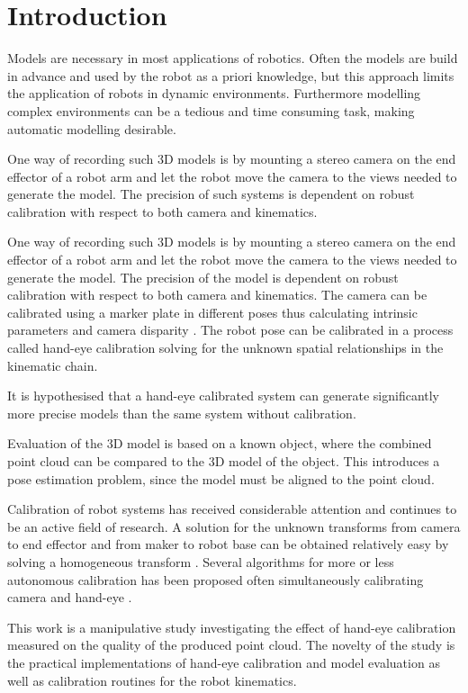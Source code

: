 \chapter{Introduction}

Models are necessary in most applications of robotics. Often the models are build in advance and used by the robot as a priori knowledge, but this approach limits the application of robots in dynamic environments. Furthermore modelling complex environments can be a tedious and time consuming task, making automatic modelling desirable. 

One way of recording such 3D models is by mounting a stereo camera on the end effector of a robot arm and let the robot move the camera to the views needed to generate the model. The precision of such systems is dependent on robust calibration with respect to both camera and kinematics.

One way of recording such 3D models is by mounting a stereo camera on the end effector of a robot arm and let the robot move the camera to the views needed to generate the model. The precision of the model is dependent on robust calibration with respect to both camera and kinematics. The camera can be calibrated using a marker plate in different poses thus calculating intrinsic parameters and camera disparity \cite{Zhang2000}. The robot pose can be calibrated in a process called hand-eye calibration solving for the unknown spatial relationships in the kinematic chain. 

It is hypothesised that a hand-eye calibrated system can generate significantly more precise models than the same system without calibration.

Evaluation of the 3D model is based on a known object, where the combined point cloud can be compared to the 3D model of the object. This introduces a pose estimation problem, since the model must be aligned to the point cloud. 

Calibration of robot systems has received considerable attention and continues to be an active field of research. A solution for the unknown transforms from camera to end effector and from maker to robot base can be obtained relatively easy by solving a homogeneous transform \cite{Shiu1989}. Several algorithms for more or less autonomous calibration has been proposed \cite{Tsai1988, Tsai1989} often simultaneously calibrating camera and hand-eye \cite{Malm2003, Zhao2008, Jordt2009}.

This work is a manipulative study investigating the effect of hand-eye calibration measured on the quality of the produced point cloud. The novelty of the study is the practical implementations of hand-eye calibration and model evaluation as well as calibration routines for the robot kinematics.


%